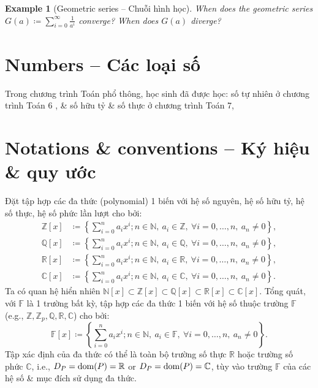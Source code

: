 \documentclass[oneside]{book}
\newtheorem{example}{Example}
\begin{document}
\begin{example}[Geometric series -- Chuỗi hình học]
	When does the geometric series $G(a)\coloneqq\sum_{i=0}^\infty \frac{1}{a^i}$ converge? When does $G(a)$ diverge? 
\end{example}


\section{Numbers -- Các loại số}
Trong chương trình Toán phổ thông, học sinh đã được học: số tự nhiên ở chương trình Toán 6 \cite{SGK_Toan_6_CD_tap_1, SGK_Toan_6_CD_tap_2}, \& số hữu tỷ \& số thực ở chương trình Toán 7,


\section{Notations \& conventions -- Ký hiệu \& quy ước}
Đặt tập hợp các đa thức (polynomial) 1 biến với hệ số nguyên, hệ số hữu tỷ, hệ số thực, hệ số phức lần lượt cho bởi:
\begin{align*}
	\mathbb{Z}[x]&\coloneqq\left\{\sum_{i=0}^n a_ix^i;n\in\mathbb{N},\ a_i\in\mathbb{Z},\ \forall i = 0,\ldots,n,\ a_n\ne0\right\},\\
	\mathbb{Q}[x]&\coloneqq\left\{\sum_{i=0}^n a_ix^i;n\in\mathbb{N},\ a_i\in\mathbb{Q},\ \forall i = 0,\ldots,n,\ a_n\ne0\right\},\\
	\mathbb{R}[x]&\coloneqq\left\{\sum_{i=0}^n a_ix^i;n\in\mathbb{N},\ a_i\in\mathbb{R},\ \forall i = 0,\ldots,n,\ a_n\ne0\right\},\\
	\mathbb{C}[x]&\coloneqq\left\{\sum_{i=0}^n a_ix^i;n\in\mathbb{N},\ a_i\in\mathbb{C},\ \forall i = 0,\ldots,n,\ a_n\ne0\right\}.
\end{align*}
Ta có quan hệ hiển nhiên $\mathbb{N}[x]\subset\mathbb{Z}[x]\subset\mathbb{Q}[x]\subset\mathbb{R}[x]\subset\mathbb{C}[x]$. Tổng quát, với $\mathbb{F}$ là 1 trường bất kỳ, tập hợp các đa thức 1 biến với hệ số thuộc trường $\mathbb{F}$ (e.g., $\mathbb{Z},\mathbb{Z}_p,\mathbb{Q},\mathbb{R},\mathbb{C}$) cho bởi:
\begin{equation*}
	\mathbb{F}[x]\coloneqq\left\{\sum_{i=0}^n a_ix^i;n\in\mathbb{N},\ a_i\in\mathbb{F},\ \forall i = 0,\ldots,n,\ a_n\ne0\right\}.
\end{equation*}
Tập xác định của đa thức có thể là toàn bộ trường số thực $\mathbb{R}$ hoặc trường số phức $\mathbb{C}$, i.e., $D_P = {\rm dom}(P) = \mathbb{R}$ or $D_P = {\rm dom}(P) = \mathbb{C}$, tùy vào trường $\mathbb{F}$ của các hệ số \& mục đích sử dụng đa thức.
\end{document}
